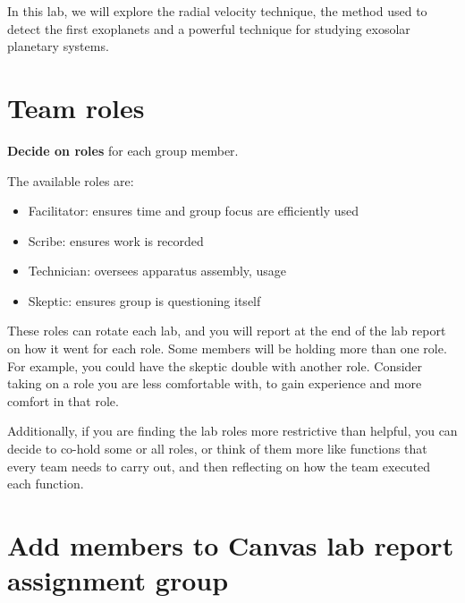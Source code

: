 In this lab, we will explore the radial velocity technique, the method used to detect the first exoplanets and a powerful technique for studying exosolar planetary systems.



\section{Team roles}

\begin{steps}
	\item \textbf{Decide on roles} for each group member.
\end{steps}

The available roles are:
\begin{itemize}
	\item Facilitator: ensures time and group focus are efficiently used
	\item Scribe: ensures work is recorded
	\item Technician: oversees apparatus assembly, usage
	\item Skeptic: ensures group is questioning itself
\end{itemize}

These roles can rotate each lab, and you will report at the end of the lab report on how it went for each role. Some members will be holding more than one role. For example, you could have the skeptic double with another role. Consider taking on a role you are less comfortable with, to gain experience and more comfort in that role.

Additionally, if you are finding the lab roles more restrictive than helpful, you can decide to co-hold some or all roles, or think of them more like functions that every team needs to carry out, and then reflecting on how the team executed each function.

\section{Add members to Canvas lab report assignment group}

